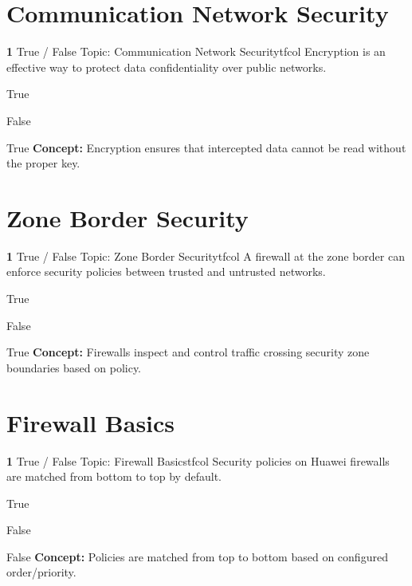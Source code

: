 \documentclass[10pt,a4paper]{article}
\begin{document}
\section{Communication Network Security}
\begin{qcard}{\color{white}\textbf{1} \hfill \small True / False \textbar{} Topic: Communication Network Security}{tfcol}
Encryption is an effective way to protect data confidentiality over public networks.

\begin{qoptions}
\item True
\item False
\end{qoptions}
\begin{explainbox}{True}
\textbf{Concept:} Encryption ensures that intercepted data cannot be read without the proper key.
\end{explainbox}
\end{qcard}

\section{Zone Border Security}
\begin{qcard}{\color{white}\textbf{1} \hfill \small True / False \textbar{} Topic: Zone Border Security}{tfcol}
A firewall at the zone border can enforce security policies between trusted and untrusted networks.

\begin{qoptions}
\item True
\item False
\end{qoptions}
\begin{explainbox}{True}
\textbf{Concept:} Firewalls inspect and control traffic crossing security zone boundaries based on policy.
\end{explainbox}
\end{qcard}

\section{Firewall Basics}
\begin{qcard}{\color{white}\textbf{1} \hfill \small True / False \textbar{} Topic: Firewall Basics}{tfcol}
Security policies on Huawei firewalls are matched from bottom to top by default.

\begin{qoptions}
\item True
\item False
\end{qoptions}
\begin{explainbox}{False}
\textbf{Concept:} Policies are matched from top to bottom based on configured order/priority.
\end{explainbox}
\end{qcard}
\end{document}
